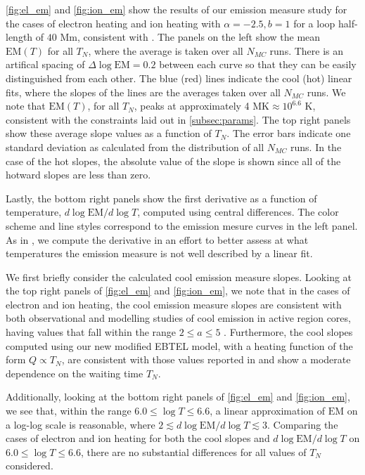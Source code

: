\documentclass[tighten,apj]{emulateapj}
\begin{document}
	\par \autoref{fig:el_em} and \autoref{fig:ion_em} show the results of our emission measure study for the cases of electron heating and ion heating with $\alpha=-2.5,b=1$ for a loop half-length of $40$ Mm, consistent with . The panels on the left show the mean $\mathrm{EM}(T)$ for all $T_N$, where the average is taken over all $N_{MC}$ runs. There is an artifical spacing of $\Delta\log{\mathrm{EM}}=0.2$ between each curve so that they can be easily distinguished from each other. The blue (red) lines indicate the cool (hot) linear fits, where the slopes of the lines are the averages taken over all $N_{MC}$ runs. We note that $\mathrm{EM}(T)$, for all $T_N$, peaks at approximately 4 MK$\approx10^{6.6}$ K, consistent with the constraints laid out in \autoref{subsec:params}. The top right panels show these average slope values as a function of $T_N$. The error bars indicate one standard deviation as calculated from the distribution of all $N_{MC}$ runs. In the case of the hot slopes, the absolute value of the slope is shown since all of the hotward slopes are less than zero. 
	\par Lastly, the bottom right panels show the first derivative as a function of temperature, $d\log{\mathrm{EM}}/d\log{T}$, computed using central differences. The color scheme and line styles correspond to the emission mesure curves in the left panel. As in , we compute the derivative in an effort to better assess at what temperatures the emission measure is not well described by a linear fit.
	\par We first briefly consider the calculated cool emission measure slopes. Looking at the top right panels of \ref{fig:el_em} and \ref{fig:ion_em}, we note that in the cases of electron and ion heating, the cool emission measure slopes are consistent with both observational and modelling studies of cool emission in active region cores, having values that fall within the range $2\le a\le5$ \citep[and references therein]{bradshaw_diagnosing_2012}. Furthermore, the cool slopes computed using our new modified EBTEL model, with a heating function of the form $Q\propto T_N$, are consistent with those values reported in \citet{cargill_active_2014} and show a moderate dependence on the waiting time $T_N$.  
	\par Additionally, looking at the bottom right panels of \autoref{fig:el_em} and \autoref{fig:ion_em}, we see that, within the range $6.0\le\log{T}\le6.6$, a linear approximation of $\mathrm{EM}$ on a log-log scale is reasonable, where $2\lesssim d\log{\mathrm{EM}/d\log{T}}\lesssim3$. Comparing the cases of electron and ion heating for both the cool slopes and $d\log{\mathrm{EM}/d\log{T}}$ on $6.0\le\log{T}\le6.6$, there are no substantial differences for all values of $T_N$ considered.
\end{document}
